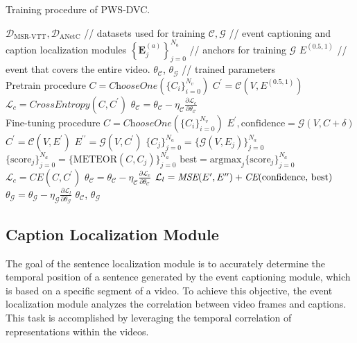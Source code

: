 \begin{algorithm}
    \caption{Training procedure of PWS-DVC.}
    \begin{algorithmic}[1]
        \renewcommand{\algorithmicrequire}{\textbf{Input:}}
        \renewcommand{\algorithmicensure}{\textbf{Output:}}
        \REQUIRE $\mathcal{D}_\text{MSR-VTT}, \mathcal{D}_\text{ANetC}$ // datasets used for training
        \REQUIRE $\mathcal{C}, \mathcal{G}$ // event captioning and caption localization modules
        \REQUIRE $\left\{\boldsymbol{E}_j^{(a)}\right\}_{j=0}^{N_a}$ // anchors for training $\mathcal{G}$
        \REQUIRE $E^{(0.5,1)}$ // event that covers the entire video.
        \ENSURE  $\theta_\mathcal{C}$, $\theta_\mathcal{G}$ // trained parameters
        \\ Pretrain procedure
        \STATE $C = \textit{ChooseOne}(\{C_i\}_{i=0}^{N_v})$
        \STATE $C^\prime = \mathcal{C}(V, E^{(0.5,1)})$
        \STATE $\mathcal{L}_c = \textit{CrossEntropy}(C, C^\prime)$
        \STATE $\theta_\mathcal{C} = \theta_\mathcal{C} - \eta_\mathcal{C} \frac{\partial \mathcal{L}_c}{\partial \theta_\mathcal{C}}$
        \ENDFOR
        \\ Fine-tuning procedure
        \STATE $C = \textit{ChooseOne}(\{C_i\}_{i=0}^{N_v})$
        \STATE $E^\prime, \text{confidence} = \mathcal{G}(V,C+\delta)$
        \STATE $C^\prime = \mathcal{C}(V,E^\prime)$
        \STATE $E^{\prime\prime} = \mathcal{G}(V,C^\prime)$
        \STATE $\{C_j\}_{j=0}^{N_a} = \{\mathcal{G}(V, E_j)\}_{j=0}^{N_a}$
        \STATE $\{\text{score}_j\}_{j=0}^{N_a}=\{\text{METEOR}(C,C_j)\}_{j=0}^{N_a}$
        \STATE $\text{best}=\text{argmax}_j\{\text{score}_j\}_{j=0}^{N_a}$
        \STATE $\mathcal{L}_c = \textit{CE}(C, C^\prime)$
        \STATE $\theta_\mathcal{C} = \theta_\mathcal{C} - \eta_\mathcal{C} \frac{\partial \mathcal{L}_c}{\partial \theta_\mathcal{C}}$
        \STATE $\mathcal{L}_l = \textit{MSE}(E^\prime, E^{\prime\prime}) + \textit{CE}(\text{confidence, \text{best}})$
        \STATE $\theta_\mathcal{G} = \theta_\mathcal{G} - \eta_\mathcal{G} \frac{\partial \mathcal{L}_l}{\partial \theta_\mathcal{G}}$
        \ENDFOR
        \RETURN $\theta_\mathcal{C}$, $\theta_\mathcal{G}$
    \end{algorithmic}
    \label{algo:training_procedure}
\end{algorithm}


\subsection{Caption Localization Module}
The goal of the sentence localization module is to accurately determine the temporal position of a sentence generated by the event captioning module, which is based on a specific segment of a video.
To achieve this objective, the event localization module analyzes the correlation between video frames and captions.
This task is accomplished by leveraging the temporal correlation of representations within the videos.

